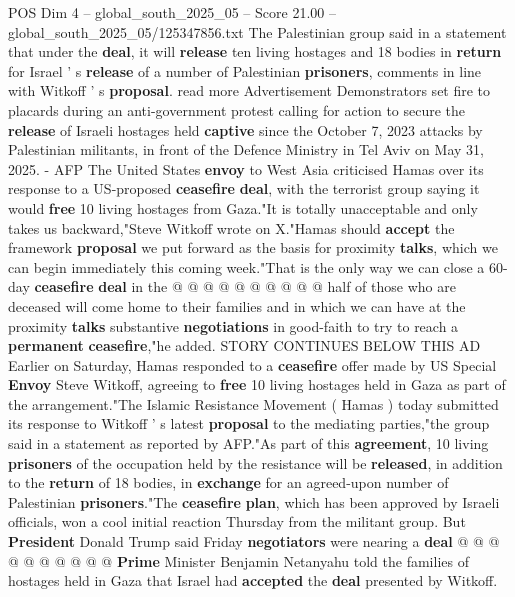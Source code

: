 \begin{textsample}{POS Dim 4 – global\_south\_2025\_05 – Score 21.00 – global\_south\_2025\_05/125347856.txt}  \label{ex:f4_pos_097}
The Palestinian group said in a statement that under the \textbf{deal}, it will \textbf{release} ten living hostages and 18 bodies in \textbf{return} for Israel ' s \textbf{release} of a number of Palestinian \textbf{prisoners}, comments in line with Witkoff ' s \textbf{proposal}. read more Advertisement Demonstrators set fire to placards during an anti-government protest calling for action to secure the \textbf{release} of Israeli hostages held \textbf{captive} since the October 7, 2023 attacks by Palestinian militants, in front of the Defence Ministry in Tel Aviv on May 31, 2025. - AFP The United States \textbf{envoy} to West Asia criticised Hamas over its response to a US-proposed \textbf{ceasefire} \textbf{deal}, with the terrorist group saying it would \textbf{free} 10 living hostages from Gaza."It is totally unacceptable and only takes us backward,"Steve Witkoff wrote on X."Hamas should \textbf{accept} the framework \textbf{proposal} we put forward as the basis for proximity \textbf{talks}, which we can begin immediately this coming week."That is the only way we can close a 60-day \textbf{ceasefire} \textbf{deal} in the @ @ @ @ @ @ @ @ @ @ half of those who are deceased will come home to their families and in which we can have at the proximity \textbf{talks} substantive \textbf{negotiations} in good-faith to try to reach a \textbf{permanent} \textbf{ceasefire},"he added.
STORY CONTINUES BELOW THIS AD Earlier on Saturday, Hamas responded to a \textbf{ceasefire} offer made by US Special \textbf{Envoy} Steve Witkoff, agreeing to \textbf{free} 10 living hostages held in Gaza as part of the arrangement."The Islamic Resistance Movement ( Hamas ) today submitted its response to Witkoff ' s latest \textbf{proposal} to the mediating parties,"the group said in a statement as reported by AFP."As part of this \textbf{agreement}, 10 living \textbf{prisoners} of the occupation held by the resistance will be \textbf{released}, in addition to the \textbf{return} of 18 bodies, in \textbf{exchange} for an agreed-upon number of Palestinian \textbf{prisoners}."The \textbf{ceasefire} \textbf{plan}, which has been approved by Israeli officials, won a cool initial reaction Thursday from the militant group.
But \textbf{President} Donald Trump said Friday \textbf{negotiators} were nearing a \textbf{deal} @ @ @ @ @ @ @ @ @ @ \textbf{Prime} Minister Benjamin Netanyahu told the families of hostages held in Gaza that Israel had \textbf{accepted} the \textbf{deal} presented by Witkoff.

\end{textsample}
